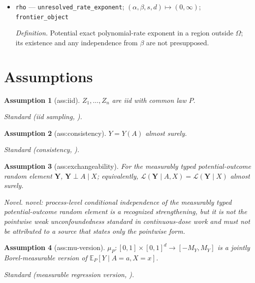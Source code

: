 \documentclass{article}
\newtheorem{assumption}{Assumption}
\begin{document}
\begin{itemize}
  \par\smallskip\noindent\emph{Definition.} \texttt{Parameter region on which the explicit beta-\allowbreak{}free estimator attains the one-\allowbreak{}dimensional oracle floor.}
  \item \texttt{rho} --- \texttt{unresolved\_\allowbreak{}rate\_\allowbreak{}exponent}; \((\alpha,\beta,s,d)\mapsto(0,\infty)\); \texttt{frontier\_\allowbreak{}object}
  \par\smallskip\noindent\emph{Definition.} Potential exact polynomial-rate exponent in a region outside \(\Omega\); its existence and any independence from \(\beta\) are not presupposed.
\end{itemize}

\section{Assumptions}

\begin{assumption}[ass:iid]\label{ass:iid}
\(Z_1,\ldots,Z_n\) are iid with common law \(P\).
\par\smallskip\noindent\emph{Standard} (iid sampling, \cite{Tsybakov2009}).
\end{assumption}

\begin{assumption}[ass:consistency]\label{ass:consistency}
\(Y=Y(A)\) almost surely.
\par\smallskip\noindent\emph{Standard} (consistency, \cite{KennedyMaMcHughSmall2017}).
\end{assumption}

\begin{assumption}[ass:exchangeability]\label{ass:exchangeability}
For the measurably typed potential-outcome random element \(\mathbf Y\), \(\mathbf Y\perp A\mid X\); equivalently, \(\mathcal L(\mathbf Y\mid A,X)=\mathcal L(\mathbf Y\mid X)\) almost surely.
\par\smallskip\noindent\emph{Novel.} novel: process-level conditional independence of the measurably typed potential-outcome random element is a recognized strengthening, but it is not the pointwise weak unconfoundedness standard in continuous-dose work and must not be attributed to a source that states only the pointwise form.
\end{assumption}

\begin{assumption}[ass:mu-version]\label{ass:mu-version}
\(\mu_P:[0,1]\times[0,1]^d\to[-M_Y,M_Y]\) is a jointly Borel-measurable version of \(\mathbb E_P[Y\mid A=a,X=x]\).
\par\smallskip\noindent\emph{Standard} (measurable regression version, \cite{Tsybakov2009}).
\end{assumption}
\end{document}
